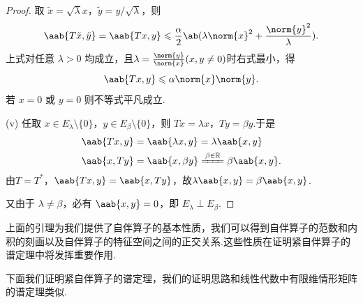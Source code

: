 \begin{proof}
取 $\tilde{x} = \sqrt{\lambda}x$，$\tilde{y} = y/\sqrt{\lambda}$，则
\begin{equation*}
\aab{T\tilde{x}, \tilde{y}} = \aab{Tx, y} \leq \frac{\alpha}{2}\ab(\lambda\norm{x}^2 + \frac{\norm{y}^2}{\lambda}).
\end{equation*}
上式对任意 $\lambda>0$ 均成立，且$\lambda = \frac{\norm{y}}{\norm{x}}(x,y\neq 0)$时右式最小，得
\begin{equation*}
\aab{Tx, y} \leq \alpha\norm{x}\norm{y}.
\end{equation*}
若 $x=0$ 或 $y=0$ 则不等式平凡成立.\par
(v) 任取 $x\in E_\lambda\setminus\{0\}$，$y\in E_\beta\setminus\{0\}$，则 $Tx = \lambda x$，$Ty = \beta y$.于是
\begin{align*}
&\aab{Tx, y} = \aab{\lambda x, y} = \lambda\aab{x, y}\\
&\aab{x, Ty} = \aab{x, \beta y} \xlongequal{\beta\in\mb{R}} \beta\aab{x, y}.
\end{align*}
由$T=T^*$，$\aab{Tx,y}=\aab{x,Ty}$，故$\lambda\aab{x,y}=\beta\aab{x,y}$.\par
又由于 $\lambda\neq\beta$，必有 $\aab{x,y}=0$，即 $E_\lambda\perp E_\beta$.
\end{proof}

上面的引理为我们提供了自伴算子的基本性质，我们可以得到自伴算子的范数和内积的刻画以及自伴算子的特征空间之间的正交关系.这些性质在证明紧自伴算子的谱定理中将发挥重要作用.\par
下面我们证明紧自伴算子的谱定理，我们的证明思路和线性代数中有限维情形矩阵的谱定理类似.\par

